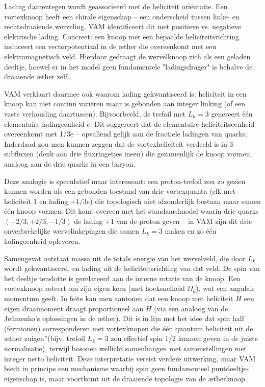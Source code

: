 Lading daarentegen wordt geassocieerd met de heliciteit oriëntatie. Een vortexknoop heeft een chirale eigenschap – een onderscheid tussen links- en rechtsdraaiende werveling. VAM identificeert dit met positieve vs. negatieve elektrische lading. Concreet: een knoop met een bepaalde heliciteitsrichting induceert een vectorpotentiaal in de æther die overeenkomt met een elektromagnetisch veld. Hierdoor gedraagt de wervelknoop zich als een geladen deeltje, hoewel er in het model geen fundamentele "ladingsdrager" is behalve de draaiende æther zelf.

VAM verklaart daarmee ook waarom lading gekwantiseerd is: heliciteit in een knoop kan niet continu variëren maar is gebonden aan integer linking (of een vaste verhouding daartussen). Bijvoorbeeld, de trefoil met $L_k=3$ genereert één elementaire ladingeenheid $e$. Dit suggereert dat de elementaire heliciteitseenheid overeenkomt met 1/3e – opvallend gelijk aan de fractiele ladingen van quarks. Inderdaad zou men kunnen zeggen dat de vortexheliciteit verdeeld is in 3 subfluxen (denk aan drie fluxringetjes ineen) die gezamenlijk de knoop vormen, analoog aan de drie quarks in een baryon.

Deze analogie is speculatief maar interessant: een proton-trefoil zou zo gezien kunnen worden als een gebonden toestand van drie vortexquanta (elk met heliciteit 1 en lading $+1/3e$) die topologisch niet afzonderlijk bestaan maar samen één knoop vormen. Dit komt overeen met het standaardmodel waarin drie quarks $(+2/3,+2/3,-1/3)$ de lading +1 van de proton geven – in VAM zijn dit drie onverbrekelijke wervelinkepingen die samen $L_k=3$ maken en zo één ladingeenheid opleveren.

Samengevat ontstaat massa uit de totale energie van het wervelveld, die door $L_k$ wordt gekwantiseerd, en lading uit de heliciteitsrichting van dat veld. De spin van het deeltje tenslotte is gerelateerd aan de interne rotatie van de knoop. Een vortexknoop roteert om zijn eigen kern (met hoeksnelheid $\Omega_k$), wat een angulair momentum geeft. In feite kan men aantonen dat een knoop met heliciteit $H$ een eigen draaimoment draagt proportioneel aan $H$ (via een analoog van de Jefimenko's oplossingen in de æther). Dit is in lijn met het idee dat spin half (fermionen) corresponderen met vortexknopen die één quantum heliciteit uit de æther \grqq zuigen\textquotedblright (bijv. trefoil $L_k=3$ zou effectief spin 1/2 kunnen geven in de juiste normalisatie), terwijl bosonen wellicht samenhangen met samenstellingen met integer netto heliciteit. Deze interpretatie vereist verdere uitwerking, maar VAM biedt in principe een mechanisme waarbij spin geen fundamenteel puntdeeltje-eigenschap is, maar voortkomt uit de draaiende topologie van de ætherknoop.